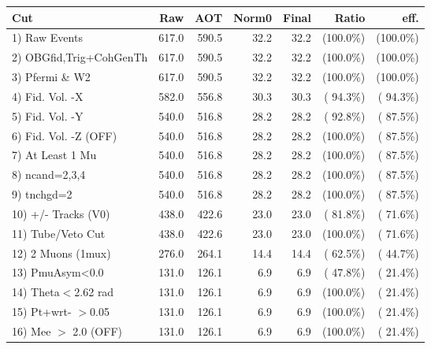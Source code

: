  \begin{table}[h!]\centering
 \begin{tabular}{||l||r|r|r|r|r|r||}
 \hline
 \hline
 Cut & Raw & AOT & Norm0 & Final & Ratio & eff.       \\
 \hline
  1) Raw Events           &        617.0 &        590.5 &         32.2 &         32.2 & (100.0\%) & (100.0\%) \\
  2) OBGfid,Trig+CohGenTh &        617.0 &        590.5 &         32.2 &         32.2 & (100.0\%) & (100.0\%) \\
  3) Pfermi \& W2         &        617.0 &        590.5 &         32.2 &         32.2 & (100.0\%) & (100.0\%) \\
  4) Fid. Vol. -X         &        582.0 &        556.8 &         30.3 &         30.3 & ( 94.3\%) & ( 94.3\%) \\
  5) Fid. Vol. -Y         &        540.0 &        516.8 &         28.2 &         28.2 & ( 92.8\%) & ( 87.5\%) \\
  6) Fid. Vol. -Z (OFF)   &        540.0 &        516.8 &         28.2 &         28.2 & (100.0\%) & ( 87.5\%) \\
  7) At Least 1 Mu        &        540.0 &        516.8 &         28.2 &         28.2 & (100.0\%) & ( 87.5\%) \\
  8) ncand=2,3,4          &        540.0 &        516.8 &         28.2 &         28.2 & (100.0\%) & ( 87.5\%) \\
  9) tnchgd=2             &        540.0 &        516.8 &         28.2 &         28.2 & (100.0\%) & ( 87.5\%) \\
 10) +/- Tracks (V0)      &        438.0 &        422.6 &         23.0 &         23.0 & ( 81.8\%) & ( 71.6\%) \\
 11) Tube/Veto Cut        &        438.0 &        422.6 &         23.0 &         23.0 & (100.0\%) & ( 71.6\%) \\
 12) 2 Muons (1mux)       &        276.0 &        264.1 &         14.4 &         14.4 & ( 62.5\%) & ( 44.7\%) \\
 13) PmuAsym<0.0          &        131.0 &        126.1 &          6.9 &          6.9 & ( 47.8\%) & ( 21.4\%) \\
 14) Theta$<$2.62 rad     &        131.0 &        126.1 &          6.9 &          6.9 & (100.0\%) & ( 21.4\%) \\
 15) Pt+wrt- $>$0.05      &        131.0 &        126.1 &          6.9 &          6.9 & (100.0\%) & ( 21.4\%) \\
 16) Mee $>$ 2.0  (OFF)   &        131.0 &        126.1 &          6.9 &          6.9 & (100.0\%) & ( 21.4\%) \\

\end{tabular}
\end{table}
